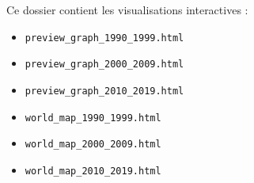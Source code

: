 \documentclass[11pt,a4paper,oneside,openany]{report}
\begin{document}
Ce dossier contient les visualisations interactives :

\begin{itemize}
    \item \texttt{preview\_graph\_1990\_1999.html}
    \item \texttt{preview\_graph\_2000\_2009.html}
    \item \texttt{preview\_graph\_2010\_2019.html}
    \item \texttt{world\_map\_1990\_1999.html}
    \item \texttt{world\_map\_2000\_2009.html}
    \item \texttt{world\_map\_2010\_2019.html}
\end{itemize}
\end{document}
